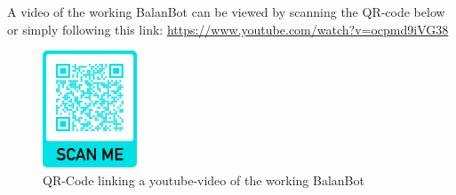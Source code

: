 A video of the working BalanBot can be viewed by scanning the QR-code below or simply following this link: \url{https://www.youtube.com/watch?v=ocpmd9iVG38}
\begin{figure}[H]
    \centering
    \includegraphics[width=0.25\textwidth]{Lab_report/pics/testvalid/frame.png}
    \caption{QR-Code linking a youtube-video of the working BalanBot}
    \label{fig:balanbot_qe}
\end{figure}